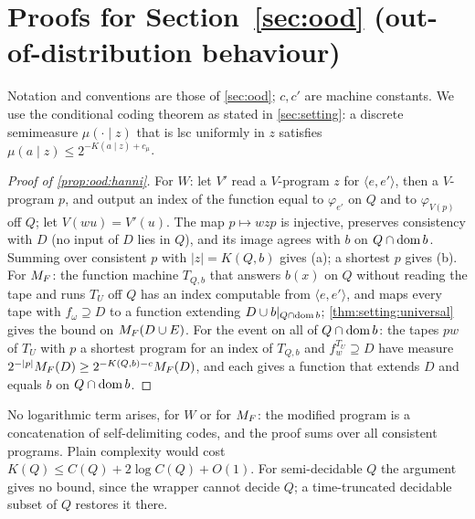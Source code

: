 \section{Proofs for Section~\ref{sec:ood} (out-of-distribution behaviour)}\label{app:ood}

Notation and conventions are those of \cref{sec:ood}; $c,c'$ are machine constants. We use the conditional coding theorem as stated in \cref{sec:setting}: a discrete semimeasure $\mu(\cdot\mid z)$ that is lsc uniformly in $z$ satisfies $\mu(a\mid z)\le2^{-K(a\mid z)+c_\mu}$.

\begin{proof}[Proof of \cref{prop:ood:hanni}]
For $W$: let $V'$ read a $V$-program $z$ for $\langle e,e'\rangle$, then a $V$-program $p$, and output an index of the function equal to $\varphi_{e'}$ on $Q$ and to $\varphi_{V(p)}$ off $Q$; let $V(wu)=V'(u)$. The map $p\mapsto wzp$ is injective, preserves consistency with $D$ (no input of $D$ lies in $Q$), and its image agrees with $b$ on $Q\cap\operatorname{dom} b$. Summing over consistent $p$ with $|z|=K(Q,b)$ gives (a); a shortest $p$ gives (b). For $M_{F}$: the function machine $T_{Q,b}$ that answers $b(x)$ on $Q$ without reading the tape and runs $T_U$ off $Q$ has an index computable from $\langle e,e'\rangle$, and maps every tape with $f_\omega\supseteq D$ to a function extending $D\cup b|_{Q\cap\operatorname{dom} b}$; \cref{thm:setting:universal} gives the bound on $M_{F}(D\cup E)$. For the event on all of $Q\cap\operatorname{dom} b$: the tapes $pw$ of $T_U$ with $p$ a shortest program for an index of $T_{Q,b}$ and $f^{T_U}_w\supseteq D$ have measure $2^{-|p|}M_{F}(D)\ge2^{-K(Q,b)-c}M_{F}(D)$, and each gives a function that extends $D$ and equals $b$ on $Q\cap\operatorname{dom} b$.
\end{proof}

\begin{remark}\label{rem:ood:logterm}
No logarithmic term arises, for $W$ or for $M_{F}$: the modified program is a concatenation of self-delimiting codes, and the proof sums over all consistent programs. Plain complexity would cost $K(Q)\le C(Q)+2\log C(Q)+O(1)$. For semi-decidable $Q$ the argument gives no bound, since the wrapper cannot decide $Q$; a time-truncated decidable subset of $Q$ restores it there.
\end{remark}

